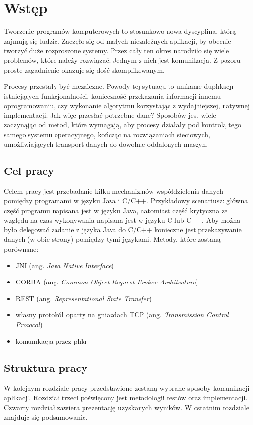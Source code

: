 \chapter{Wstęp}

Tworzenie programów komputerowych to stosunkowo nowa dyscyplina, którą zajmują się ludzie. Zaczęło się od małych niezależnych aplikacji, by obecnie tworzyć duże rozproszone systemy. Przez cały ten okres narodziło się wiele problemów, które należy rozwiązać. Jednym z nich jest komunikacja. Z pozoru proste zagadnienie okazuje się dość skomplikowanym.

Procesy przestały być niezależne. Powody tej sytuacji to unikanie duplikacji istniejących funkcjonalności, konieczność przekazania informacji innemu oprogramowaniu, czy wykonanie algorytmu korzystając z wydajniejszej, natywnej implementacji. Jak więc przesłać potrzebne dane? Sposobów jest wiele - zaczynąjąc od metod, które wymagają, aby procesy działały pod kontrolą tego samego systemu operacyjnego, kończąc na rozwiązaniach sieciowych, umożliwiających transport danych do dowolnie oddalonych maszyn.


\section{Cel pracy}

Celem pracy jest przebadanie kilku mechanizmów współdzielenia  danych pomiędzy programami w języku Java i C/C++. 
Przykładowy scenariusz: główna część programu napisana jest w języku Java, natomiast część krytyczna ze względu na czas wykonywania napisana jest w języku C lub C++. Aby można było delegować zadanie z języka Java do C/C++ konieczne jest przekazywanie danych (w obie strony) pomiędzy tymi językami. Metody, które zostaną porównane:
\begin{itemize}
    \item JNI (ang. \textit{Java Native Interface})
    \item CORBA (ang. \textit{Common Object Request Broker Architecture})
    \item REST (ang. \textit{Representational State Transfer})
    \item własny protokół oparty na gniazdach TCP (ang. \textit{Transmission Control Protocol})
    \item komunikacja przez pliki
\end{itemize}


\section{Struktura pracy}

W kolejnym rozdziale pracy przedstawione zostaną wybrane sposoby komunikacji aplikacji.
Rozdział trzeci poświęcony jest metodologii testów oraz implementacji.
Czwarty rozdział zawiera prezentację uzyskanych wyników.
W ostatnim rozdziale znajduje się podsumowanie.
